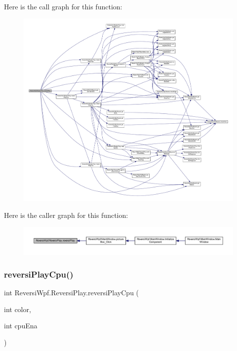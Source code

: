 Here is the call graph for this function\+:
\nopagebreak
\begin{figure}[H]
\begin{center}
\leavevmode
\includegraphics[width=350pt]{class_reversi_wpf_1_1_reversi_play_a735fd2b6a5f7be5089f702f5265cd183_cgraph}
\end{center}
\end{figure}
Here is the caller graph for this function\+:
\nopagebreak
\begin{figure}[H]
\begin{center}
\leavevmode
\includegraphics[width=350pt]{class_reversi_wpf_1_1_reversi_play_a735fd2b6a5f7be5089f702f5265cd183_icgraph}
\end{center}
\end{figure}
\mbox{\label{class_reversi_wpf_1_1_reversi_play_ab9824cdb1bc61ac894ea237b732bd166}} 
\subsubsection{\texorpdfstring{reversi\+Play\+Cpu()}{reversiPlayCpu()}}
{\footnotesize\ttfamily int Reversi\+Wpf.\+Reversi\+Play.\+reversi\+Play\+Cpu (\begin{DoxyParamCaption}\item[{int}]{color,  }\item[{int}]{cpu\+Ena }\end{DoxyParamCaption})}



